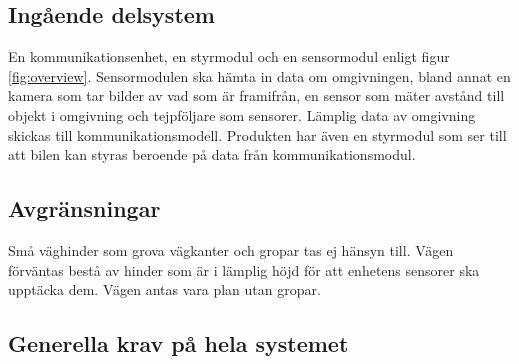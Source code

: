 \documentclass[kravspec/krav.tex]{subfiles}
\begin{document}
\subsection{Ingående delsystem}
En kommunikationsenhet, en styrmodul och en sensormodul enligt figur
\ref{fig:overview}. Sensormodulen ska hämta in data om omgivningen, bland annat
en kamera som tar bilder av vad som är framifrån, en sensor som mäter avstånd
till objekt i omgivning och tejpföljare som sensorer. Lämplig data av omgivning
skickas till kommunikationsmodell. Produkten har även en styrmodul som ser till
att bilen kan styras beroende på data från kommunikationsmodul.

\subsection{Avgränsningar}
Små väghinder som grova vägkanter och gropar tas ej hänsyn till. Vägen
förväntas bestå av hinder som är i lämplig höjd för att enhetens sensorer ska
upptäcka dem. Vägen antas vara plan utan gropar.

\subsection{Generella krav på hela systemet}

\begin{reqlist}
\end{reqlist}
\end{document}
